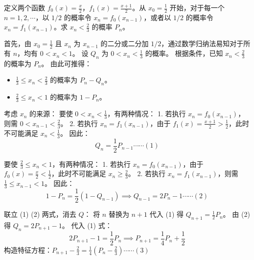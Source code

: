 \begin{questions}

\question
定义两个函数 $f_0(x) = \frac{x}{2}$，$f_1(x) = \frac{x+1}{2}$。从 $x_0 = \frac{1}{2}$ 开始，对于每一个 $n=1, 2, \cdots$，以 $1/2$ 的概率令 $x_n = f_0(x_{n-1})$，或者以 $1/2$ 的概率令 $x_n = f_1(x_{n-1})$。求 $x_n < \frac{2}{3}$ 的概率 $P_n$。

\begin{solution}
首先，由 $x_0 = \frac{1}{2}$ 且 $x_n$ 为 $x_{n-1}$ 的二分或二分加 $1/2$，通过数学归纳法易知对于所有 $n$，均有 $0 < x_n < 1$。
设 $Q_n$ 为 $0 < x_n < \frac{1}{3}$ 的概率。
根据条件，已知 $x_n < \frac{2}{3}$ 的概率为 $P_n$。
由此可推得：
\begin{itemize}
    \item $\frac{1}{3} \le x_n < \frac{2}{3}$ 的概率为 $P_n - Q_n$。
    \item $\frac{2}{3} \le x_n < 1$ 的概率为 $1 - P_n$。
\end{itemize}

考虑 $x_n$ 的来源：
要使 $0 < x_n < \frac{1}{3}$，有两种情况：
1. 若执行 $x_n = f_0(x_{n-1})$，则需 $0 < x_{n-1} < \frac{2}{3}$。
2. 若执行 $x_n = f_1(x_{n-1})$，由于 $f_1(x) = \frac{x+1}{2} > \frac{1}{2}$，此时不可能满足 $x_n < \frac{1}{3}$。
因此：
\[ Q_n = \frac{1}{2} P_{n-1} \cdots \cdots (1) \]

要使 $\frac{2}{3} \le x_n < 1$，有两种情况：
1. 若执行 $x_n = f_0(x_{n-1})$，由于 $f_0(x) = \frac{x}{2} < \frac{1}{2}$，此时不可能满足 $x_n \ge \frac{2}{3}$。
2. 若执行 $x_n = f_1(x_{n-1})$，则需 $\frac{1}{3} \le x_{n-1} < 1$。
因此：
\[ 1 - P_n = \frac{1}{2} (1 - Q_{n-1}) \implies Q_{n-1} = 2P_n - 1 \cdots \cdots (2) \]

联立 (1) (2) 两式，消去 $Q$：
将 $n$ 替换为 $n+1$ 代入 (1) 得 $Q_{n+1} = \frac{1}{2} P_n$。
由 (2) 得 $Q_n = 2P_{n+1} - 1$。
代入 (1) 式：
\[ 2P_{n+1} - 1 = \frac{1}{2} P_n \implies P_{n+1} = \frac{1}{4} P_n + \frac{1}{2} \]
构造特征方程：$P_{n+1} - \frac{2}{3} = \frac{1}{4} (P_n - \frac{2}{3}) \cdots \cdots (3)$


\end{solution}
\end{questions}
